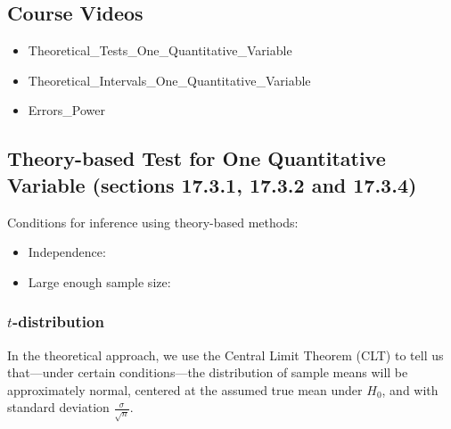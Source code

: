 \documentclass[
]{report}
\providecommand{\tightlist}{%
  \setlength{\itemsep}{0pt}\setlength{\parskip}{0pt}}
\begin{document}
\subsection{Course Videos}\label{course-videos-5}

\begin{itemize}
\item
  Theoretical\_Tests\_One\_Quantitative\_Variable
\item
  Theoretical\_Intervals\_One\_Quantitative\_Variable
\item
  Errors\_Power
\end{itemize}


\subsection*{Theory-based Test for One Quantitative Variable (sections 17.3.1, 17.3.2 and 17.3.4)}\label{theory-based-test-for-one-quantitative-variable-sections-17.3.1-17.3.2-and-17.3.4}

Conditions for inference using theory-based methods:

\begin{itemize}
\tightlist
\item
  Independence:
\end{itemize}

\vspace{0.2in}

\begin{itemize}
\tightlist
\item
  Large enough sample size:
\end{itemize}

\vspace{1in}

\subsubsection*{\texorpdfstring{\(t\)-distribution}{t-distribution}}\label{t-distribution}

In the theoretical approach, we use the Central Limit Theorem (CLT) to tell us that---under certain conditions---the distribution of sample means will be approximately normal, centered at the assumed true mean under \(H_0\), and with standard deviation \(\frac{\sigma}{\sqrt{n}}\).
\end{document}
